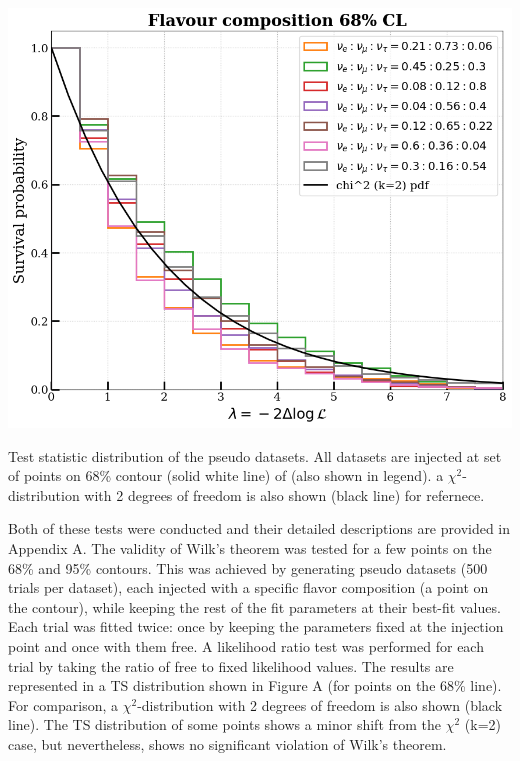 \begin{marginfigure}
    
    \includegraphics{./figures/results/wilk's test.png}
    
    \caption{Test statistic distribution of the pseudo datasets. All datasets are injected at set of points on 68\% contour (solid white line) of  (also shown in legend). a $\chi^2$-distribution with 2 degrees of freedom is also shown (black line) for refernece.}

\end{marginfigure}

Both of these tests were conducted and their detailed descriptions are provided in Appendix A. The validity of Wilk's theorem was tested for a few points on the 68\% and 95\% contours. This was achieved by generating pseudo datasets (500 trials per dataset), each injected with a specific flavor composition (a point on the contour), while keeping the rest of the fit parameters at their best-fit values. Each trial was fitted twice: once by keeping the parameters fixed at the injection point and once with them free. A likelihood ratio test was performed for each trial by taking the ratio of free to fixed likelihood values. The results are represented in a TS distribution shown in Figure A (for points on the 68\% line). For comparison, a $\chi^2$-distribution with 2 degrees of freedom is also shown (black line). The TS distribution of some points shows a minor shift from the $\chi^2$ (k=2) case, but nevertheless, shows no significant violation of Wilk's theorem.



